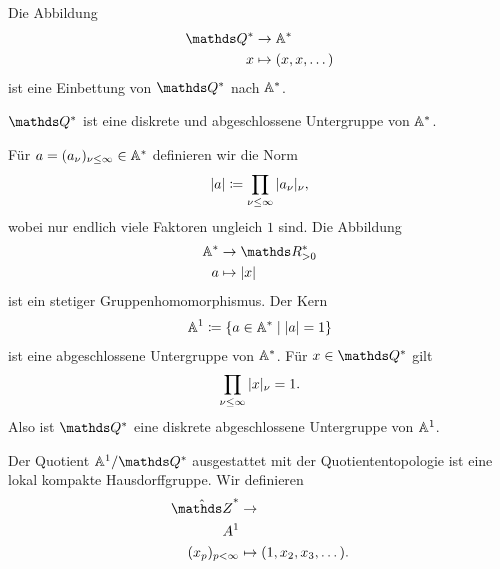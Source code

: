 Die Abbildung
\begin{align*}
\Q^\ast &\to \A^\ast\\
x&\mapsto (x,x,\dots)
\end{align*}
ist eine Einbettung von $\Q^\ast$ nach $\mathbb{A}^\ast$.

\begin{prop}
$\Q^\ast$ ist eine diskrete und abgeschlossene Untergruppe von $\mathbb{A}^\ast$.
\end{prop}

Für $a=(a_\nu)_{\nu \leq \infty} \in \mathbb{A}^\ast$ definieren wir die Norm
\begin{align*}
|a|\coloneqq \prod_{\nu \leq \infty} |a_\nu|_\nu,
\end{align*}
wobei nur endlich viele Faktoren ungleich $1$ sind.
Die Abbildung
\begin{align*}
\A^\ast &\to \R_{>0}^\ast\\
a &\mapsto \abs{x}
\end{align*}
ist ein stetiger Gruppenhomomorphismus.
Der Kern
\begin{align*}
\mathbb{A}^1\coloneqq \{a \in \mathbb{A}^\ast \mid |a|=1\}
\end{align*}
ist eine abgeschlossene Untergruppe von $\mathbb{A}^\ast$.
Für $x \in \Q^\ast$ gilt
\begin{align*}
\prod_{\nu \leq \infty} |x|_\nu=1.
\end{align*}
Also ist $\Q^\ast$ eine diskrete abgeschlossene Untergruppe von $\mathbb{A}^1$.


Der Quotient $\A^1/\Q^\ast$ ausgestattet mit der Quotiententopologie ist eine lokal kompakte Hausdorffgruppe.
Wir definieren
\begin{align*}
\hat{\Z}^\ast &\to \\A^1\\
(x_p)_{p<\infty} &\mapsto (1,x_2,x_3,\dots).
\end{align*}

